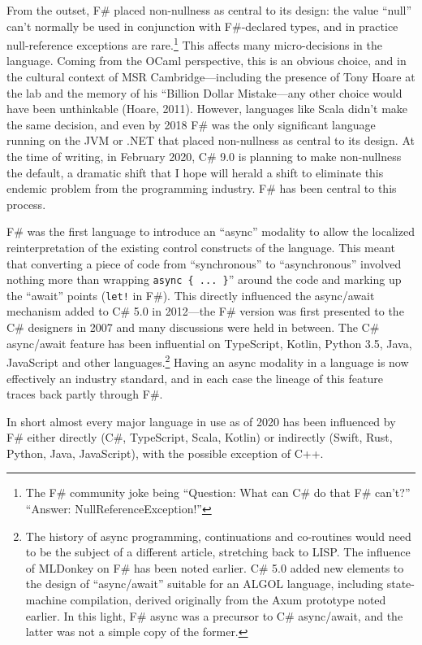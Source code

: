 \documentclass[acmsmall]{acmart}\settopmatter{}
\begin{document}
From the outset, F\# placed non-nullness as central to its design: the value “null” can’t normally be used in conjunction
with F\#-declared types, and in practice null-reference exceptions are rare.\footnote{The F\# community joke being “Question: What can C\# do that F\# can’t?” “Answer: NullReferenceException!”}   This affects many micro-decisions in the
language. Coming from the OCaml perspective, this is an obvious choice, and in the cultural context of MSR
Cambridge---including the presence of Tony Hoare at the lab and the memory of his “Billion Dollar Mistake---any
other choice would have been unthinkable (Hoare, 2011).  However, languages like Scala didn’t make the same
decision, and even by 2018 F\# was the only significant language running on the JVM or .NET that placed non-nullness
as central to its design. At the time of writing, in February 2020, C\# 9.0 is planning to make non-nullness the
default, a dramatic shift that I hope will herald a shift to eliminate this endemic problem from the programming industry. F\# has been central to this process.

F\# was the first language to introduce an “async” modality to allow the localized reinterpretation of the existing
control constructs of the language. This meant that converting a piece of code from “synchronous” to
“asynchronous” involved nothing more than wrapping \texttt{async \{ ... \}}” around the code and marking up
the “await” points (\texttt{let!} in F\#).   This directly influenced the async/await mechanism added to C\# 5.0 in 2012---the
F\# version was first presented to the C\# designers in 2007 and many discussions were held in
between.  The C\# async/await feature has been influential on TypeScript, Kotlin, Python 3.5, Java, JavaScript and other
languages.\footnote{The history of async programming, continuations and co-routines would need to be the subject
of a different article, stretching back to LISP. The influence of MLDonkey
on F\# has been noted earlier. C\# 5.0 added new elements to the design
of “async/await” suitable for an ALGOL language, including state-machine compilation,
derived originally from the Axum prototype noted earlier.  In this light, F\# async was a
precursor to C\# async/await, and the latter was not a simple copy of the former.}
Having an async modality in a language is now effectively an industry standard, and in each case the lineage of this
feature traces back partly through F\#.

In short almost every major language in use as of 2020 has been influenced by F\# either directly (C\#, TypeScript, Scala, Kotlin) or
indirectly (Swift, Rust, Python, Java, JavaScript), with the possible exception of C++.
\end{document}
